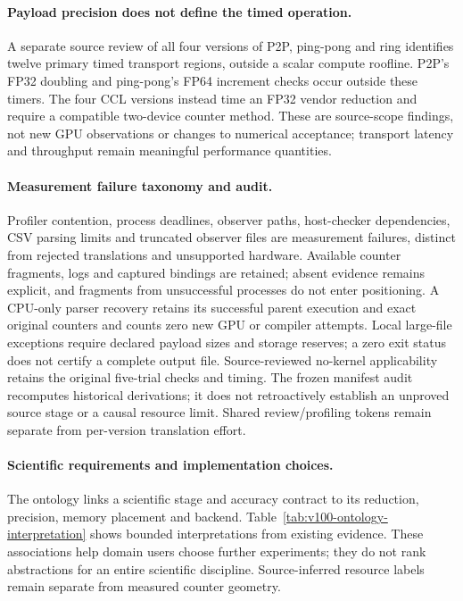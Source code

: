 \paragraph{Payload precision does not define the timed operation.}
A separate source review of all four versions of P2P, ping-pong and ring identifies twelve primary timed transport regions, outside a scalar compute roofline. P2P's FP32 doubling and ping-pong's FP64 increment checks occur outside these timers. The four CCL versions instead time an FP32 vendor reduction and require a compatible two-device counter method. These are source-scope findings, not new GPU observations or changes to numerical acceptance; transport latency and throughput remain meaningful performance quantities.

\paragraph{Measurement failure taxonomy and audit.}
Profiler contention, process deadlines, observer paths, host-checker dependencies, CSV parsing limits and truncated observer files are measurement failures, distinct from rejected translations and unsupported hardware. Available counter fragments, logs and captured bindings are retained; absent evidence remains explicit, and fragments from unsuccessful processes do not enter positioning. A CPU-only parser recovery retains its successful parent execution and exact original counters and counts zero new GPU or compiler attempts. Local large-file exceptions require declared payload sizes and storage reserves; a zero exit status does not certify a complete output file. Source-reviewed no-kernel applicability retains the original five-trial checks and timing. The frozen manifest audit recomputes historical derivations; it does not retroactively establish an unproved source stage or a causal resource limit. Shared review/profiling tokens remain separate from per-version translation effort.

\paragraph{Scientific requirements and implementation choices.}
The ontology links a scientific stage and accuracy contract to its reduction, precision, memory placement and backend. Table~\ref{tab:v100-ontology-interpretation} shows bounded interpretations from existing evidence. These associations help domain users choose further experiments; they do not rank abstractions for an entire scientific discipline. Source-inferred resource labels remain separate from measured counter geometry.

